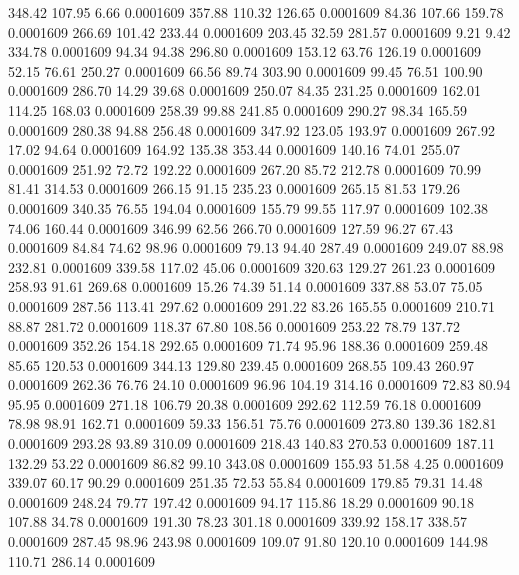  348.42  107.95    6.66   0.0001609
 357.88  110.32  126.65   0.0001609
  84.36  107.66  159.78   0.0001609
 266.69  101.42  233.44   0.0001609
 203.45   32.59  281.57   0.0001609
   9.21    9.42  334.78   0.0001609
  94.34   94.38  296.80   0.0001609
 153.12   63.76  126.19   0.0001609
  52.15   76.61  250.27   0.0001609
  66.56   89.74  303.90   0.0001609
  99.45   76.51  100.90   0.0001609
 286.70   14.29   39.68   0.0001609
 250.07   84.35  231.25   0.0001609
 162.01  114.25  168.03   0.0001609
 258.39   99.88  241.85   0.0001609
 290.27   98.34  165.59   0.0001609
 280.38   94.88  256.48   0.0001609
 347.92  123.05  193.97   0.0001609
 267.92   17.02   94.64   0.0001609
 164.92  135.38  353.44   0.0001609
 140.16   74.01  255.07   0.0001609
 251.92   72.72  192.22   0.0001609
 267.20   85.72  212.78   0.0001609
  70.99   81.41  314.53   0.0001609
 266.15   91.15  235.23   0.0001609
 265.15   81.53  179.26   0.0001609
 340.35   76.55  194.04   0.0001609
 155.79   99.55  117.97   0.0001609
 102.38   74.06  160.44   0.0001609
 346.99   62.56  266.70   0.0001609
 127.59   96.27   67.43   0.0001609
  84.84   74.62   98.96   0.0001609
  79.13   94.40  287.49   0.0001609
 249.07   88.98  232.81   0.0001609
 339.58  117.02   45.06   0.0001609
 320.63  129.27  261.23   0.0001609
 258.93   91.61  269.68   0.0001609
  15.26   74.39   51.14   0.0001609
 337.88   53.07   75.05   0.0001609
 287.56  113.41  297.62   0.0001609
 291.22   83.26  165.55   0.0001609
 210.71   88.87  281.72   0.0001609
 118.37   67.80  108.56   0.0001609
 253.22   78.79  137.72   0.0001609
 352.26  154.18  292.65   0.0001609
  71.74   95.96  188.36   0.0001609
 259.48   85.65  120.53   0.0001609
 344.13  129.80  239.45   0.0001609
 268.55  109.43  260.97   0.0001609
 262.36   76.76   24.10   0.0001609
  96.96  104.19  314.16   0.0001609
  72.83   80.94   95.95   0.0001609
 271.18  106.79   20.38   0.0001609
 292.62  112.59   76.18   0.0001609
  78.98   98.91  162.71   0.0001609
  59.33  156.51   75.76   0.0001609
 273.80  139.36  182.81   0.0001609
 293.28   93.89  310.09   0.0001609
 218.43  140.83  270.53   0.0001609
 187.11  132.29   53.22   0.0001609
  86.82   99.10  343.08   0.0001609
 155.93   51.58    4.25   0.0001609
 339.07   60.17   90.29   0.0001609
 251.35   72.53   55.84   0.0001609
 179.85   79.31   14.48   0.0001609
 248.24   79.77  197.42   0.0001609
  94.17  115.86   18.29   0.0001609
  90.18  107.88   34.78   0.0001609
 191.30   78.23  301.18   0.0001609
 339.92  158.17  338.57   0.0001609
 287.45   98.96  243.98   0.0001609
 109.07   91.80  120.10   0.0001609
 144.98  110.71  286.14   0.0001609
